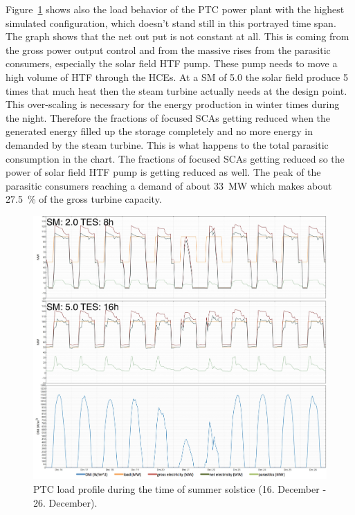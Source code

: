 Figure~\ref{PTC_summer_load} shows also the load behavior of the \ac{PTC} power plant with the highest simulated configuration, which doesn't stand still in this portrayed time span. The graph shows that the net out put is not constant at all. This is coming from the gross power output control and from the massive rises from the parasitic consumers, especially the solar field \ac{HTF} pump. These pump needs to move a high volume of \ac{HTF} through the \acp{HCE}. At a \ac{SM} of 5.0 the solar field produce 5 times that much heat then the steam turbine actually needs at the design point. This over-scaling is necessary for the energy production in winter times during the night. Therefore the fractions of focused \acp{SCA} getting reduced when the generated energy filled up the storage completely and no more energy in demanded by the steam turbine. This is what  happens to the total parasitic consumption in the chart. The fractions of focused \acp{SCA} getting reduced so the power of solar field \ac{HTF} pump is getting reduced as well. The peak of the parasitic consumers reaching a demand of about \SI{33}{MW} which makes about 27.5~\% of the gross turbine capacity.

\begin{figure}[htbp]  
\centering
\includegraphics[width=1\linewidth]{FIG/PTC_summer_load}
\caption[PTC load profile during the time of summer solstice.]{PTC load profile during the time of summer solstice (16. December - 26. December).}\label{PTC_summer_load}
\end{figure}

